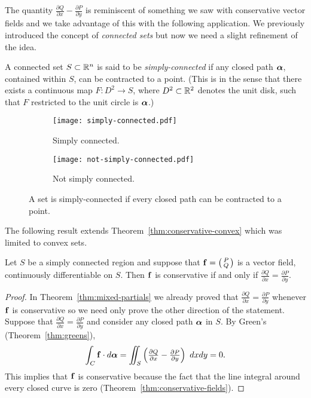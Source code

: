 The quantity \(\tfrac{\partial Q}{\partial x} - \tfrac{\partial P}{\partial y}\) is reminiscent of something we saw with conservative vector fields and we take advantage of this with the following application.
We previously introduced the concept of \emph{connected sets} but now we need a slight refinement of the idea.
%
\begin{definition}%
    \label{def:simply-connected}
    A connected set \(S\subset \mathbb{R}^n\) is said to be \emph{simply-connected} if any closed path \(\boldsymbol{\alpha}\), contained within \(S\), can be contracted to a point.
    (This is in the sense that there exists a continuous map \(F:D^{2}\to S\), where \(D^2\subset \mathbb{R}^2\) denotes the unit disk, such that \(F\) restricted  to the unit circle is \(\boldsymbol{\alpha}\).)
\end{definition}
%
\begin{figure}
    \centering
    \begin{subfigure}[b]{0.5\textwidth}
        \centering
        \texttt{[image: simply-connected.pdf]}
        \caption{Simply connected.}
    \end{subfigure}%
    \begin{subfigure}[b]{0.5\textwidth}
        \centering
        \texttt{[image: not-simply-connected.pdf]}
        \caption{Not simply connected.}
    \end{subfigure}
    \caption{A set is simply-connected if every closed path can be contracted to a point.}
\end{figure}

The following result extends Theorem~\ref{thm:conservative-convex} which was limited to convex sets.
%
\begin{theorem}%
    \label{thm:conservative-fields-simply-connected}
    Let \(S\) be a simply connected region and suppose that \(\mathbf{f} = \left(\begin{smallmatrix}
            P \\ Q
        \end{smallmatrix}\right)\)
    is a vector field, continuously differentiable on \(S\).
    Then \(\mathbf{f}\) is conservative if and only if \(\tfrac{\partial Q}{\partial x} = \tfrac{\partial P}{\partial y}\).
\end{theorem}

\begin{proof}
    In Theorem~\ref{thm:mixed-partials} we already proved that \(\tfrac{\partial Q}{\partial x} = \tfrac{\partial P}{\partial y}\) whenever \(\mathbf{f}\) is conservative so we need only prove the other direction of the statement.
    Suppose that  \(\tfrac{\partial Q}{\partial x} = \tfrac{\partial P}{\partial y}\) and consider any closed path \(\boldsymbol{\alpha}\) in \(S\).
    By Green's (Theorem~\ref{thm:greens}),
    \[
        \int_{C} \mathbf{f} \cdot d\boldsymbol{\alpha} = \iint_{S} \left(\tfrac{\partial Q}{\partial x} - \tfrac{\partial P}{\partial y}\right) \ dx dy = 0.
    \]
    This implies that \(\mathbf{f}\) is conservative because the fact that the line integral around every closed curve is zero (Theorem~\ref{thm:conservative-fields}).
\end{proof}

